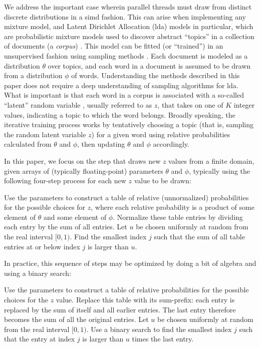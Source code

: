 \documentclass[10pt,nohyperref]{sigplanconf}
\begin{document}
We address the important case wherein parallel threads must
draw from distinct discrete distributions in a {\sc simd} fashion.
This can arise when implementing any mixture model, and Latent Dirichlet Allocation ({\sc lda}) models in particular,
which are probabilistic mixture models used to discover abstract ``topics'' in a collection of documents (a \emph{corpus}) \cite{blei_latent_2003}. This model can be fitted (or ``trained'') in an unsupervised fashion using sampling methods \cite[chapter 11]{Bishop}\cite{griffiths_finding_2004}. Each document is modeled as a distribution $\theta$ over topics, and each word in a document is assumed to be drawn from a distribution $\phi$ of words. Understanding the methods described in this paper does not require a deep understanding of sampling algorithms for {\sc lda}. What is important is that each word in a corpus is associated with a so-called ``latent'' random variable \cite[chapter 9]{Bishop}, usually referred to as $z$, that takes on one of $K$ integer values, indicating a topic to which the word belongs.  Broadly speaking, the iterative training process works by tentatively choosing a topic (that is, sampling the random latent variable $z$) for a given word using relative probabilities calculated from $\theta$ and $\phi$, then updating $\theta$ and $\phi$ accordingly.

In this paper, we focus on the step that draws new $z$ values from a finite domain,
given arrays of (typically floating-point) parameters $\theta$ and $\phi$,
typically using the following four-step process for each new $z$ value to be drawn:
\par{}Use the parameters to construct a table of relative (unnormalized) probabilities for the possible choices for $z$,
where each relative probability is a product of some element of $\theta$ and some element of $\phi$.
\hfill{}Normalize these table entries by dividing each entry by the sum of all entries.
\hfill{}Let $u$ be chosen uniformly at random from the real interval $[0,1)$.
\hfill{}Find the smallest index $j$ such that the sum of all table entries at or below index $j$ is larger than $u$.
\par\noindent In practice, this sequence of steps may be optimized
by doing a bit of algebra and using a binary search:
\par{}Use the parameters to construct a table of relative probabilities for the possible choices for the $z$ value.
\hfill{}Replace this table with its sum-prefix: each entry is replaced by the sum of itself and all earlier entries.  The last entry therefore becomes the sum of all the original entries.
\hfill{}Let $u$ be chosen uniformly at random from the real interval $[0,1)$.
\hfill{}Use a binary search to find the smallest index $j$ such that the entry at index $j$ is larger than $u$ times the last entry.
\end{document}
